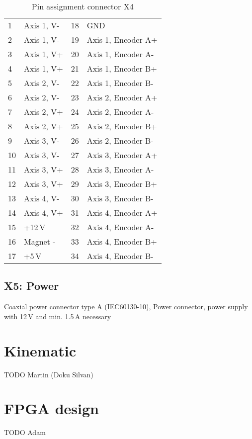 \begin{table}
	\begin{center}
		\begin{tabular}{lp{4cm} lp{4cm}}
		1  & Axis 1, V- & 18 & GND \\
		2  & Axis 1, V- & 19 & Axis 1, Encoder A+ \\
		3  & Axis 1, V+ & 20 & Axis 1, Encoder A- \\
		4  & Axis 1, V+ & 21 & Axis 1, Encoder B+ \\
		5  & Axis 2, V- & 22 & Axis 1, Encoder B- \\
		6  & Axis 2, V- & 23 & Axis 2, Encoder A+ \\
		7  & Axis 2, V+ & 24 & Axis 2, Encoder A- \\
		8  & Axis 2, V+ & 25 & Axis 2, Encoder B+ \\
		9  & Axis 3, V- & 26 & Axis 2, Encoder B- \\
		10 & Axis 3, V- & 27 & Axis 3, Encoder A+ \\
		11 & Axis 3, V+ & 28 & Axis 3, Encoder A- \\
		12 & Axis 3, V+ & 29 & Axis 3, Encoder B+ \\
		13 & Axis 4, V- & 30 & Axis 3, Encoder B- \\
		14 & Axis 4, V+ & 31 & Axis 4, Encoder A+ \\
		15 & +12\,V     & 32 & Axis 4, Encoder A- \\
		16 & Magnet -   & 33 & Axis 4, Encoder B+ \\
		17 & +5\,V      & 34 & Axis 4, Encoder B- \\
		\end{tabular}
		\caption{Pin assignment connector X4}
		\label{tab:ConnectorX4PinAssignment}
	\end{center}
\end{table} 

\subsection{X5: Power}
Coaxial power connector type A (IEC60130-10), Power connector, power supply with 12\,V and min. 1.5\,A necessary

\section{Kinematic}
TODO Martin (Doku Silvan)

\section{FPGA design}
TODO Adam

